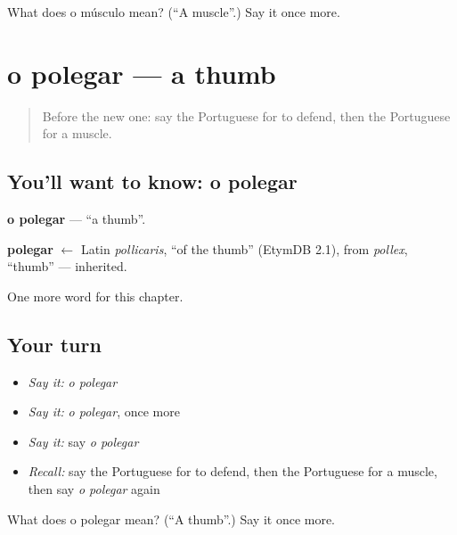 \begin{tcolorbox}[breakable,colback=teal!4,colframe=teal!35!black,title={Before you move on}]
What does o músculo mean? (\textquotedblleft{}A muscle\textquotedblright{}.) Say it once more.
\end{tcolorbox}
\section[o polegar]{o polegar — a thumb}

\label{lesson:PT-C180-polegar}



\begin{quote}
Before the new one: say the Portuguese for to defend, then the Portuguese for a muscle.
\end{quote}

\subsection*{You'll want to know: o polegar}
\textbf{o polegar} — \textquotedblleft{}a thumb\textquotedblright{}.

\begin{cousinweb}
\textbf{polegar} $\leftarrow$ Latin \emph{pollicaris}, \textquotedblleft{}of the thumb\textquotedblright{} (EtymDB 2.1), from \emph{pollex}, \textquotedblleft{}thumb\textquotedblright{} — inherited.
\end{cousinweb}

\begin{grammarlens}[title={What you've built}]
One more word for this chapter.
\end{grammarlens}

\subsection*{Your turn}
\begin{itemize}
\raggedright
  \item \emph{Say it:} \emph{o polegar}
  \item \emph{Say it:} \emph{o polegar}, once more
  \item \emph{Say it:} say \emph{o polegar}
  \item \emph{Recall:} say the Portuguese for to defend, then the Portuguese for a muscle, then say \emph{o polegar} again
\end{itemize}

\begin{tcolorbox}[breakable,colback=teal!4,colframe=teal!35!black,title={Before you move on}]
What does o polegar mean? (\textquotedblleft{}A thumb\textquotedblright{}.) Say it once more.
\end{tcolorbox}
